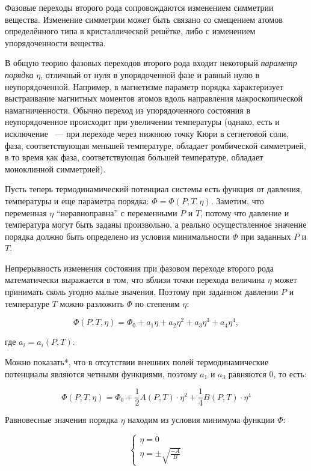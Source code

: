 \documentclass[a4paper, 12pt]{article}
\begin{document}
Фазовые переходы второго рода сопровождаются изменением симметрии вещества. Изменение симметрии может быть связано со смещением атомов определённого типа в кристаллической решётке, либо с изменением упорядоченности вещества.

В общую теорию фазовых переходов второго рода входит некоторый \emph{параметр порядка} $\eta$, отличный от нуля в упорядоченной фазе и равный нулю в неупорядоченной. Например, в магнетизме параметр порядка характеризует выстраивание магнитных моментов атомов вдоль направления макроскопической намагниченности. Обычно переход из упорядоченного состояния в неупорядоченное происходит при увеличении температуры (однако, есть и исключение ~--- при переходе через нижнюю точку Кюри в сегнетовой соли, фаза, соответствующая меньшей температуре, обладает ромбической симметрией, в то время как фаза, соответствующая большей температуре, обладает моноклинной симметрией). 

Пусть теперь термодинамический потенциал системы есть функция от давления, температуры и еще параметра порядка: $\Phi = \Phi(P, T, \eta)$. Заметим, что переменная $\eta$  ``неравноправна'' с переменными $P$ и $T$, потому что давление и температура могут быть заданы произвольно, а реально осуществленное значение порядка должно быть определено из условия минимальности $\Phi$ при заданных $P$ и $T$.

Непрерывность изменения состояния при фазовом переходе второго рода математически выражается в том, что вблизи точки перехода величина $\eta$ может принимать сколь угодно малые значения. Поэтому при заданном давлении $P$ и температуре $T$ можно разложить $\Phi$ по степеням $\eta$:

$$ 
	\Phi(P, T, \eta) = \Phi_0 + a_1 \eta + a_2 \eta^2 + a_3 \eta^3 + a_4 \eta^4,
$$

где $a_i = a_i(P, T)$.

Можно показать*, что в отсутствии внешних полей термодинамические потенциалы являются четными функциями, поэтому $a_1$ и $a_3$ равняются 0, то есть:

$$
	\Phi(P, T, \eta) = \Phi_0 + \frac{1}{2} A(P, T) \cdot \eta^2 + \frac{1}{4} B(P, T) \cdot \eta^4
$$

Равновесные значения порядка $\eta$ находим из условия минимума функции $\Phi$:

$$
\begin{cases}
	\eta = 0 \\
	\eta = \pm \sqrt{\frac{-A}{B}}
\end{cases}
$$
\end{document}
